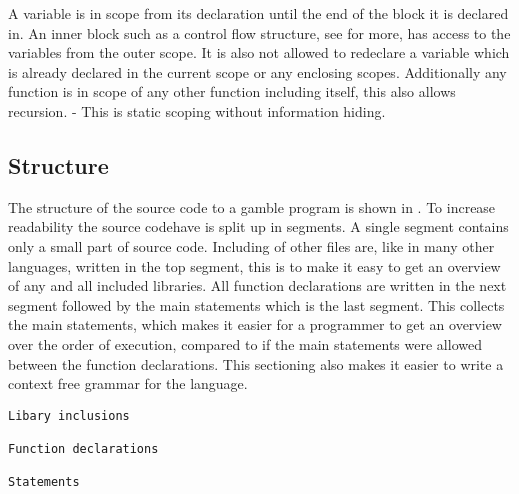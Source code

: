 A variable is in scope from its declaration until the end of the block it is declared in.
An inner block such as a control flow structure, see  for more, has access to the variables from the outer scope. 
It is also not allowed to redeclare a variable which is already declared in the current scope or any enclosing scopes. 
Additionally any function is in scope of any other function including itself, this also allows recursion. 
- This is static scoping without information hiding. 

\subsection*{Structure}\label{subsec:Struc}
The structure of the source code to a \gls{gamble} program is shown in .
To increase readability the source codehave is split up in segments.
A single segment contains only a small part of source code.
Including of other files are, like in many other languages, written in the top segment, this is to make it easy to get an overview of any and all included libraries. 
All function declarations are written in the next segment followed by the main statements which is the last segment.
This collects the main statements, which makes it easier for a programmer to get an overview over the order of execution, compared to if the main statements were allowed between the function declarations.
This sectioning also makes it easier to write a context free grammar for the language. 

\begin{lstlisting}[caption={Source code file layout in \gls{gamble}},frame=tlrb,label={lst:Structure}, numbers=none]
Libary inclusions

Function declarations

Statements
\end{lstlisting}

